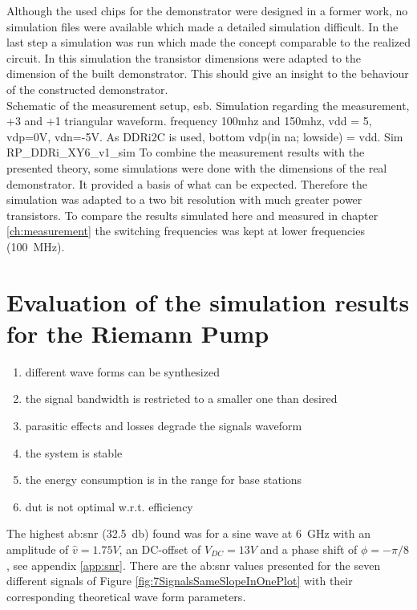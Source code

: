 Although the used chips for the demonstrator were designed in a former work, no simulation files were available which made a detailed simulation difficult.
In the last step a simulation was run which made the concept comparable to the realized circuit. 
In this simulation the transistor dimensions were adapted to the dimension of the built demonstrator. 
This should give an insight to the behaviour of the constructed demonstrator.\\
Schematic of the measurement setup, esb.
Simulation regarding the measurement, +3 and +1 triangular waveform.
frequency 100mhz and 150mhz, vdd = 5, vdp=0V, vdn=-5V.
As DDRi2C is used, bottom vdp(in na; lowside) = vdd. 
Sim RP\_DDRi\_XY6\_v1\_sim
To combine the measurement results with the presented theory, some simulations were done with the dimensions of the real demonstrator.
It provided a basis of what can be expected.
Therefore the simulation was adapted to a two bit resolution with much greater power transistors.
To compare the results simulated here and measured in chapter \ref{ch:measurement} the switching frequencies was kept at lower frequencies (\SI{100}{\mega \hertz}).


 


\section{Evaluation of the simulation results for the Riemann Pump}

\begin{enumerate}
	\item different wave forms can be synthesized
	\item the signal bandwidth is restricted to a smaller one than desired
	\item parasitic effects and losses degrade the signals waveform
	\item the system is stable
	\item the energy consumption is in the range for base stations
	\item dut is not optimal w.r.t. efficiency
\end{enumerate}

The highest \gls{ab:snr} (\SI{32.5}{\decibel}) found was for a sine wave at \SI{6}{\giga \hertz} with an amplitude of $\hat{v} = 1.75 V$, an DC-offset of $V_{DC} = 13 V$ and a phase shift of $\phi = -\pi/8$, see appendix \ref{app:snr}.
There are the \gls{ab:snr} values presented for the seven different signals of Figure \ref{fig:7SignalsSameSlopeInOnePlot} with their corresponding theoretical wave form parameters.

